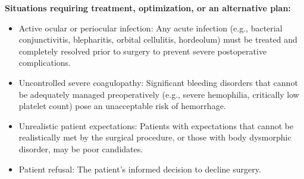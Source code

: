\textbf{Situations requiring treatment, optimization, or an alternative plan:}
\begin{itemize}
  \item Active ocular or periocular infection: Any acute infection (e.g., bacterial conjunctivitis, blepharitis, orbital cellulitis, hordeolum) must be treated and completely resolved prior to surgery to prevent severe postoperative complications.

  \item Uncontrolled severe coagulopathy: Significant bleeding disorders that cannot be adequately managed preoperatively (e.g., severe hemophilia, critically low platelet count) pose an unacceptable risk of hemorrhage.

  \item Unrealistic patient expectations: Patients with expectations that cannot be realistically met by the surgical procedure, or those with body dysmorphic disorder, may be poor candidates.

  \item Patient refusal: The patient's informed decision to decline surgery.
\end{itemize}

